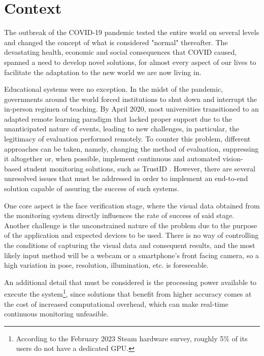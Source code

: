 \documentclass[class=report, crop=false, a4paper, 12pt]{standalone}
\begin{document}
\section{Context}
The outbreak of the COVID-19 pandemic tested the entire world on several levels and changed the concept of what is considered "normal" thereafter. The devastating health, economic and social consequences that COVID caused, spanned a need to develop novel solutions, for almost every aspect of our lives to facilitate the adaptation to the new world we are now living in. 

\par Educational systems were no exception. In the midst of the pandemic, governments around the world forced institutions to shut down and interrupt the in-person regimen of teaching. By April 2020, most universities transitioned to an adapted remote learning paradigm \autocite{winsteadRemoteMicroelectronicsLaboratory2022} that lacked proper support due to the unanticipated nature of events, leading to new challenges, in particular, the legitimacy of evaluation performed remotely. To counter this problem, different approaches can be taken, namely, changing the method of evaluation, suppressing it altogether \autocite{barronrodriguezRemoteLearningGlobal2021} or, when possible, implement continuous and automated vision-based student monitoring solutions, such as TrustID \autocite{fariaImagebasedFaceVerification2023}. However, there are several unresolved issues that must be addressed in order to implement an end-to-end solution capable of assuring the success of such systems. 

\par One core aspect is the face verification stage, where the visual data obtained from the monitoring system directly influences the rate of success of said stage. Another challenge is the unconstrained nature of the problem due to the purpose of the application and expected devices to be used. There is no way of controlling the conditions of capturing the visual data and consequent results, and the most likely input method will be a webcam or a smartphone's front facing camera, so a high variation in pose, resolution, illumination, etc. is foreseeable. 

\par An additional detail that must be considered is the processing power available to execute the system\footnote{According to the February 2023 Steam hardware survey, roughly 5\% of its users do not have a dedicated GPU.}, since solutions that benefit from higher accuracy comes at the cost of increased computational overhead, which can make real-time continuous monitoring unfeasible.
\end{document}
